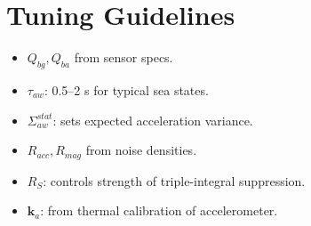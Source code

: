 \documentclass[11pt]{article}
\begin{document}
\section{Tuning Guidelines}
\begin{itemize}
\item $Q_{bg},Q_{ba}$ from sensor specs.
\item $\tau_{aw}$: 0.5–2 s for typical sea states.
\item $\Sigma_{aw}^{stat}$: sets expected acceleration variance.
\item $R_{acc},R_{mag}$ from noise densities.
\item $R_S$: controls strength of triple-integral suppression.
\item $\bm k_a$: from thermal calibration of accelerometer.
\end{itemize}
\end{document}
